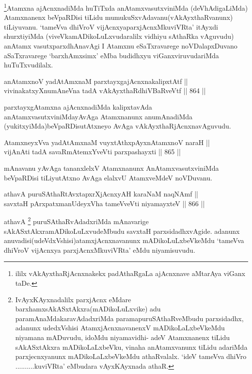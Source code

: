 \begin{artha}
\footnote{ililx vAkAyxthaRjAcnxnakekx padAthaRgaLa ajAcnxnave aMtarAya viGanx taDe.}Atamxna ajAcnxnadiMda huTiTxda anAtamxvasutxviniMda (deVhAdigaLiMda) Atamxnanenx beVpaRDisi tiLidu mumukuSxvAdavanu\break (vAkAyxthaRvanunx) tiLiyuvanu. `tameVva dhiVroV vijAcnxya\break parxjAcnxMkuviVRta' itAyxdi shurxtiyiMda (viveVkamADikoLuLxvudaralilx vidhiyu sAthaRka vAguvudu) anAtamx vasutxparxdhAnavAgi I Atamxnu eSaTxravarege noVDalapxDuvano aSaTxravarege `barxhAmxsimx' eMba budidhxyu viGanxviruvudariMda huTuTxvudilalx.
\end{artha}


\begin{shl}
anAtamxnoV yadA\s \s tAmxnaM parxtayxgajAcnxnakalipxtAtf || \\
vivinakatxyXnumAneVna tadA vAkAyxthaRdhiVBaRveVtf \hfill || 864 ||  
\end{shl}

\begin{artha}
parxtayxgAtamxna ajAcnxnadiMda kalipxtavAda anAtamxvasutxviniMda\break yAvAga Atamxnanunx anumAnadiMda (yukitxyiMda)\break beVpaRDisutAtxneyo AvAga vAkAyxthaRjAcnxnavAguvudu.
\end{artha}


\begin{shl}
AtamxneyxVva yadA\s \s tAmxnaM vuyxtAthxpAyxnAtamxnoV naraH || \\
vijAnAti tadA savaRmAtemxYveVti parxpashayxti \hfill || 865 ||  
\end{shl}

\begin{artha}
mAnavanu yAvAga tananxlelxV Atamxnanunx AnAtamxvasutxviniMda beVpaRDisi tiLiyutAtxno AvAga elalxvU AtamxveMdeV noVDuvanu.
\end{artha}


\begin{shl}
athavA puruSAthaRtAvxtapxrXjAcnxyAH karaNaM naqNAmf || \\
savxtaH pArxpatxmanUdeyxVha tameVveVti niyamayxteV \hfill || 866 ||  
\end{shl}

\begin{artha}
athavA \footnote{IvAyxKAyxnadalilx parxjAcnx eMdare barxhamxsAkASxtAkxra(mADikoLuLxvike) adu paramAnaMdakaravAdadxriMda paramapuruSAthaRveMbudu parxsidadhx, adanunx udedxVshisi AtamxjAcnxnavanenxV mADikoLaLxbeVkeMdu niyamana mADuvudu, idoMdu niyamavidhi- adeV Atamxnanenx tiLidu sAkASxtAkxra mADikoLaLxbeVku, vinaha anAtamxvanunx tiLidu adariMda parxjecnxyanunx mADikoLaLxbeVkeMdu athaRvalalx. `ideV tameVva dhiVro ..........kuviVRta' eMbudara vAyxKAyxnada athaR.} puruSAthaRvAdadxriMda mAnavarige sAkASxtAkxramADikoLuLxvudeMbudu savxtaH parxsidadhxvAgide. adanunx anuvadisi\break (udeVdxVshisi)atamxjAcnxnavanunx mADikoLuLxbeVkeMdu `tameVva dhiVroV vijAcnxya parxjAcnxMkuviVRta' eMdu niyamisuvudu.
\end{artha}

